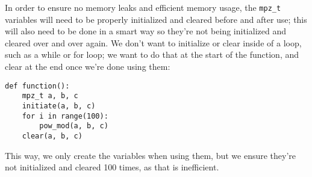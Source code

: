 \documentclass[12pt]{article}
\begin{document}
In order to ensure no memory leaks and efficient memory usage, the \verb|mpz_t| variables will need to be properly initialized and cleared before and after use; this will also need to be done in a smart way so they're not being initialized and cleared over and over again. We don't want to initialize or clear inside of a loop, such as a while or for loop; we want to do that at the start of the function, and clear at the end once we're done using them:\begin{verbatim}
def function():
    mpz_t a, b, c
    initiate(a, b, c)
    for i in range(100):
        pow_mod(a, b, c)
    clear(a, b, c)
\end{verbatim}
This way, we only create the variables when using them, but we ensure they're not initialized and cleared 100 times, as that is inefficient.
\end{document}
